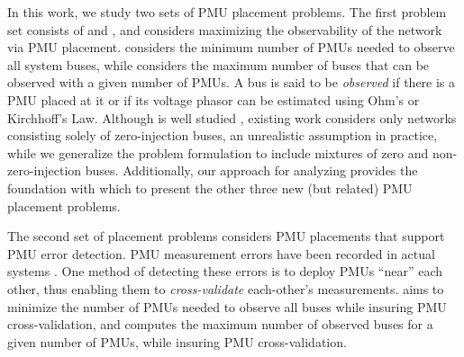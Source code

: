 
In this work, we study two sets of PMU placement problems.  The first problem set consists of \full and \maxincs, and considers maximizing the observability of the network via PMU placement. \full considers the minimum number of PMUs needed 
to observe all system buses, while
\maxinc considers the maximum number of buses that can be observed with a given
number of PMUs. 
A bus is said to be {\em observed} if there is a PMU placed at it or if
its voltage phasor can be estimated using Ohm's or Kirchhoff's Law.  Although \full is well studied \cite{Baldwin93,Brueni05,Haynes02,Mili90,Xu04}, existing work considers only networks consisting solely of zero-injection buses, 
an unrealistic assumption in practice,
while we generalize the problem formulation to include mixtures of zero and  non-zero-injection buses. Additionally, our approach for analyzing \full provides the foundation with which to present the other three new (but related) PMU placement problems.

The second set of placement problems considers PMU placements that support PMU error detection. PMU measurement errors have been recorded in actual systems \cite{Vanfretti10}. One method of detecting these errors is to deploy PMUs ``near'' each other, thus enabling them to {\em cross-validate} each-other's measurements. %
{\xvals} aims to minimize the number of PMUs needed to observe all buses while insuring PMU cross-validation, and {\xvalparts} computes the maximum number of observed buses for a given number of PMUs, while insuring PMU cross-validation.


